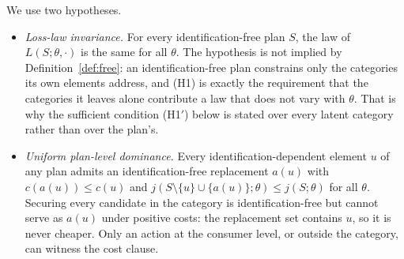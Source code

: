 \documentclass[pdflatex,sn-mathphys-num]{sn-jnl}
\theoremstyle{thmstyleone}
\theoremstyle{thmstyletwo}
\theoremstyle{thmstylethree}
\begin{document}
We use two hypotheses.
\begin{itemize}
\item[(H1)] \emph{Loss-law invariance.} For every identification-free plan
$S$, the law of $L(S;\theta,\cdot)$ is the same for all $\theta$. The
hypothesis is not implied by Definition~\ref{def:free}: an
identification-free plan constrains only the categories its own elements
address, and (H1) is exactly the requirement that the categories it leaves
alone contribute a law that does not vary with $\theta$. That is why the
sufficient condition (H1$'$) below is stated over every latent category rather
than over the plan's.
\item[(H2)] \emph{Uniform plan-level dominance.} Every
identification-dependent element $u$ of any plan admits an
identification-free replacement $a(u)$ with $c(a(u))\le c(u)$ and
$j(S\setminus\{u\}\cup\{a(u)\};\theta)\le j(S;\theta)$ for all $\theta$.
Securing every candidate in the category is identification-free but cannot
serve as $a(u)$ under positive costs: the replacement set contains $u$, so it
is never cheaper. Only an action at the consumer level, or outside the
category, can witness the cost clause.
\end{itemize}
\end{document}
